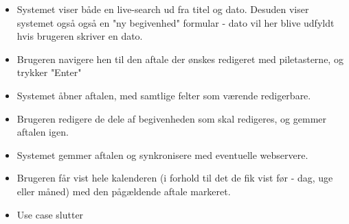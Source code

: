 \documentclass{article}
\begin{document}
\begin{itemize}
\begin{itemize}
   	\item Systemet viser både en live-search ud fra titel og dato. Desuden viser systemet også også en "ny begivenhed" formular - dato vil her blive udfyldt hvis brugeren skriver en dato.
   	\item Brugeren navigere hen til den aftale der ønskes redigeret med piletasterne, og trykker "Enter"
   	\item Systemet åbner aftalen, med samtlige felter som værende redigerbare.
   	\item Brugeren redigere de dele af begivenheden som skal redigeres, og gemmer aftalen igen.
   	\item Systemet gemmer aftalen og synkronisere med eventuelle webservere.
   	\item Brugeren får vist hele kalenderen (i forhold til det de fik vist før - dag, uge eller måned) med den pågældende aftale markeret.
   	\item Use case slutter
   	\end{itemize}
   

\end{itemize}
\end{document}
